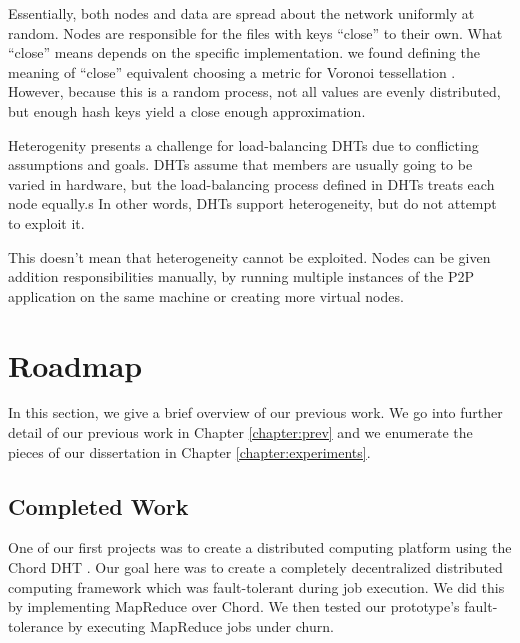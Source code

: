 Essentially, both nodes and data are spread about the network uniformly at random.
Nodes are responsible for the files with keys ``close'' to their own.
What ``close'' means depends on the specific implementation. 
we found defining the meaning of ``close'' equivalent choosing a metric for Voronoi tessellation \cite{vhash}.
However, because this is a random process, not all values are evenly distributed, but enough hash keys yield a close enough approximation.

Heterogenity presents a challenge for load-balancing DHTs due to conflicting assumptions and goals. 
DHTs assume that members are usually going to be varied in hardware, but the load-balancing process defined in DHTs treats each node equally.s
In other words, DHTs support heterogeneity, but do not attempt to exploit it.

This doesn't mean that heterogeneity cannot be exploited.
Nodes can be given addition responsibilities manually, by running multiple instances of the P2P application on the same machine or creating more virtual nodes.



\section{Roadmap}

In this section, we give a brief overview of our previous work.
We go into further detail of our previous work in Chapter \ref{chapter:prev} and we enumerate the pieces of our dissertation in Chapter \ref{chapter:experiments}. 
\subsection{Completed Work}

One of our first projects was to create a distributed computing platform using the Chord DHT \cite{chordreduce}.
Our goal here was to create a completely decentralized distributed computing framework which was fault-tolerant during job execution.
We did this by implementing MapReduce over Chord.
We then tested our prototype's fault-tolerance by executing MapReduce jobs under churn.

